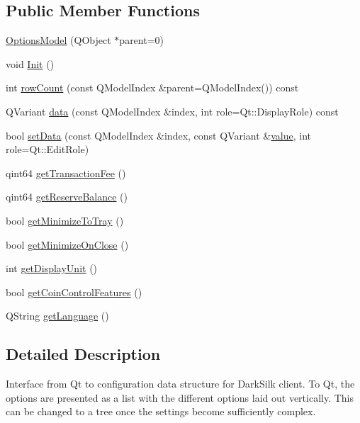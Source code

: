 \subsection*{Public Member Functions}
\begin{DoxyCompactItemize}
\item 
\hyperlink{class_options_model_a17c6b3de70c415b0fdf5c27f5f871054}{Options\+Model} (Q\+Object $\ast$parent=0)
\item 
void \hyperlink{class_options_model_a0e02c341067bff7be262fede017fbea0}{Init} ()
\item 
int \hyperlink{class_options_model_a5e6046048ca49ee81671467648dd6e59}{row\+Count} (const Q\+Model\+Index \&parent=Q\+Model\+Index()) const 
\item 
Q\+Variant \hyperlink{class_options_model_a56d6c626e3315792c31f44754b2c8d73}{data} (const Q\+Model\+Index \&index, int role=Qt\+::\+Display\+Role) const 
\item 
bool \hyperlink{class_options_model_a3102b457f4d46efac8ecb03b3d536b62}{set\+Data} (const Q\+Model\+Index \&index, const Q\+Variant \&\hyperlink{cache_8cc_a0f61d63b009d0880a89c843bd50d8d76}{value}, int role=Qt\+::\+Edit\+Role)
\item 
qint64 \hyperlink{class_options_model_aacf28a7a54b6292b8d59baf54caf215e}{get\+Transaction\+Fee} ()
\item 
qint64 \hyperlink{class_options_model_a650c71793e4ce653f0435f0720f7c5b4}{get\+Reserve\+Balance} ()
\item 
bool \hyperlink{class_options_model_af026ad3b0705de76c1f57d9a6132aec0}{get\+Minimize\+To\+Tray} ()
\item 
bool \hyperlink{class_options_model_a82cd711817f3c9c87efbfa71b5ae0629}{get\+Minimize\+On\+Close} ()
\item 
int \hyperlink{class_options_model_a3b6e4d4ef42be3aaba315b8cd14f468e}{get\+Display\+Unit} ()
\item 
bool \hyperlink{class_options_model_ace6c871068f613aee277e37bfdc988c0}{get\+Coin\+Control\+Features} ()
\item 
Q\+String \hyperlink{class_options_model_aeb8bb84a039c8357a69ed696d4499e33}{get\+Language} ()
\end{DoxyCompactItemize}


\subsection{Detailed Description}
Interface from Qt to configuration data structure for Dark\+Silk client. To Qt, the options are presented as a list with the different options laid out vertically. This can be changed to a tree once the settings become sufficiently complex. 

